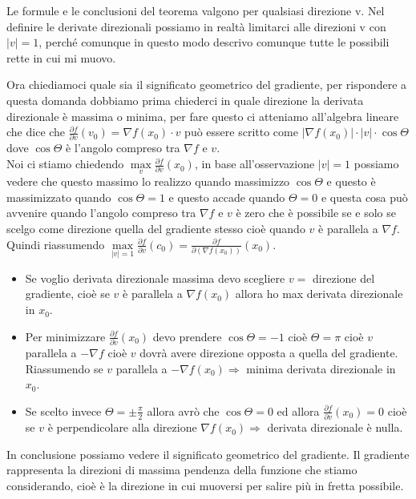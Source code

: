 \begin{observation}
Le formule e le conclusioni del teorema valgono per qualsiasi direzione v. Nel definire le derivate direzionali possiamo in realtà limitarci alle direzioni v con $|v| = 1$, perché comunque in questo modo descrivo comunque tutte le possibili rette in cui mi muovo.
\end{observation}

\hspace{-15pt}Ora chiediamoci quale sia il significato geometrico del gradiente, per rispondere a questa domanda dobbiamo prima chiederci in quale direzione la derivata direzionale è massima o minima, per fare questo ci atteniamo all'algebra lineare che dice che $\frac{\partial f}{\partial v}(v_0) = \nabla f(x_0) \cdot v$ può essere scritto come $|\nabla f(x_0)| \cdot |v| \cdot \cos{\Theta}$ dove $\cos{\Theta}$ è l'angolo compreso tra $\nabla f$ e $v$. \\
Noi ci stiamo chiedendo $\max\limits_v \frac{\partial f}{\partial v}(x_0)$, in base all'osservazione $|v| = 1$ possiamo vedere che questo massimo lo realizzo quando massimizzo $\cos{\Theta}$ e questo è massimizzato quando $\cos{\Theta} = 1$ e questo accade quando $\Theta = 0$ e questa cosa può avvenire quando l'angolo compreso tra $\nabla f$ e $v$ è zero che è possibile se e solo se scelgo come direzione quella del gradiente stesso cioè quando $v$ è parallela a $\nabla f$.\\
Quindi riassumendo $\max\limits_{|v| = 1} \frac{\partial f}{\partial v}(c_0) = \frac{\partial f}{\partial (\nabla f(x_0))}(x_0)$.
\begin{itemize}
    \item Se voglio derivata direzionale massima devo scegliere $v =$ direzione del gradiente, cioè se $v$ è parallela a $\nabla f(x_0)$ allora ho max derivata direzionale in $x_0$.
    \item Per minimizzare $\frac{\partial f}{\partial v}(x_0)$ devo prendere $\cos{\Theta} = -1$ cioè $\Theta = \pi$ cioè $v$ parallela a $-\nabla f$ cioè $v$ dovrà avere direzione opposta a quella del gradiente. Riassumendo se $v$ parallela a $-\nabla f(x_0) \Longrightarrow$ minima derivata direzionale in $x_0$.
    \item Se scelto invece $\Theta = \pm \frac{\pi}{2}$ allora avrò che $\cos{\Theta} = 0$ ed allora $\frac{\partial f}{\partial v}(x_0) = 0$ cioè se $v$ è perpendicolare alla direzione $\nabla f(x_0) \Longrightarrow$ derivata direzionale è nulla.
\end{itemize}
In conclusione possiamo vedere il significato geometrico del gradiente. Il gradiente rappresenta la direzioni di massima pendenza della funzione che stiamo considerando, cioè è la direzione in cui muoversi per salire più in fretta possibile.\\\\
